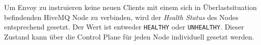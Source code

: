 Um Envoy zu instruieren keine neuen Clients mit einem sich in Überlastsituation befindenden HiveMQ Node zu verbinden, wird der \textit{Health Status} des Nodes entsprechend gesetzt.
Der Wert ist entweder \verb|HEALTHY| oder \verb|UNHEALTHY|. Dieser Zustand kann über die Control Plane für jeden Node individuell gesetzt werden.
\cite{HealthCheckEnvoy}

